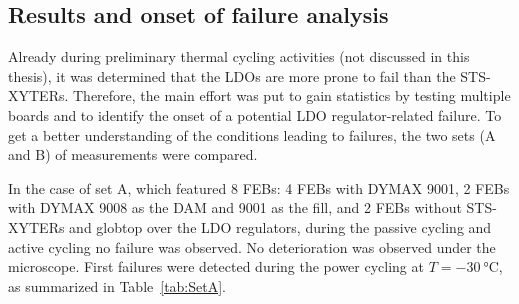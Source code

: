 \subsection{Results and onset of failure analysis}
Already during preliminary thermal cycling activities (not discussed in this thesis), it was determined that the \glspl{LDO} are more prone to fail than the STS-XYTERs. Therefore, the main effort was put to gain statistics by testing multiple boards and to identify the onset of a potential \gls{LDO} regulator-related failure. To get a better understanding of the conditions leading to failures, the two sets (A and B) of measurements were compared. 


In the case of set A, which featured 8 \glspl{FEB}: 4 \glspl{FEB} with DYMAX 9001, 2 \glspl{FEB} with DYMAX 9008 as the DAM and 9001 as the fill, and 2 \glspl{FEB} without STS-XYTERs and globtop over the \gls{LDO} regulators, during the passive cycling and active cycling no failure was observed. No deterioration was observed under the microscope. First failures were detected during the power cycling at $T=\SI{-30}{\celsius}$, as summarized in Table~\ref{tab:SetA}. 

